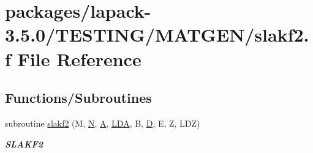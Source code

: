 \hypertarget{slakf2_8f}{}\section{packages/lapack-\/3.5.0/\+T\+E\+S\+T\+I\+N\+G/\+M\+A\+T\+G\+E\+N/slakf2.f File Reference}
\label{slakf2_8f}
\subsection*{Functions/\+Subroutines}
\begin{DoxyCompactItemize}
\item 
subroutine \hyperlink{group__real__matgen_ga2b9000ce75fc048e922106a3ff84b51e}{slakf2} (M, \hyperlink{polmisc_8c_a0240ac851181b84ac374872dc5434ee4}{N}, \hyperlink{classA}{A}, \hyperlink{example__user_8c_ae946da542ce0db94dced19b2ecefd1aa}{L\+D\+A}, B, \hyperlink{odrpack_8h_a7dae6ea403d00f3687f24a874e67d139}{D}, E, Z, L\+D\+Z)
\begin{DoxyCompactList}\small\item\em {\bfseries S\+L\+A\+K\+F2} \end{DoxyCompactList}\end{DoxyCompactItemize}

